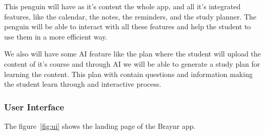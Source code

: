 \documentclass{report}
\begin{document}
This penguin will have as it's content the whole app, and all it's integrated features, like the calendar, the notes, the reminders, and the study planner. The penguin will be able to interact with all these features and help the student to use them in a more efficient way.

We also will have some AI feature like the plan where the student will upload the content of it's course and through AI we will be able to generate a study plan for learning the content. This plan with contain questions and information making the student learn through and interactive process.

\subsubsection{User Interface}

The figure~\ref{fig:ui} shows the landing page of the Braynr app.
\end{document}
